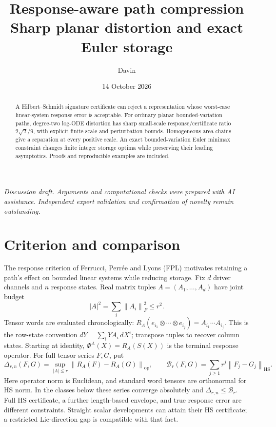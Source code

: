 \documentclass[11pt,a4paper]{article}
\title{\vspace{-12mm}Response-aware path compression\\
\large Sharp planar distortion and exact Euler storage}
\author{Davin}
\date{14 October 2026}
\newcommand{\HS}{\mathrm{HS}}
\newcommand{\op}{\mathrm{op}}
\newcommand{\B}{\mathcal B}
\newcommand{\Del}{\Delta}
\newcommand{\norm}[1]{\left\lVert#1\right\rVert}
\begin{document}
\maketitle
\vspace{-6mm}
\begin{abstract}
A Hilbert--Schmidt signature certificate can reject a representation whose
worst-case linear-system response error is acceptable. For ordinary planar
bounded-variation paths, degree-two log-ODE distortion has sharp small-scale
response/certificate ratio \(2\sqrt2/9\), with explicit finite-scale and
perturbation bounds. Homogeneous area chains give a separation at every
positive scale. An exact bounded-variation Euler minimax constraint changes
finite integer storage optima while preserving their leading asymptotics.
Proofs and reproducible examples are included.
\end{abstract}
\vspace{-2mm}
{\small\emph{Discussion draft. Arguments and computational checks were prepared
with AI assistance. Independent expert validation and confirmation of novelty
remain outstanding.}}

\section{Criterion and comparison}
The response criterion of Ferrucci, Perr\'ee and Lyons (FPL)
\cite{ferrucci2026concise} motivates retaining a path's effect on bounded
linear systems while reducing storage. Fix \(d\) driver channels and \(n\)
response states. Real matrix tuples \(A=(A_1,\ldots,A_d)\) have joint budget
\[
 |A|^2=\sum_i\norm{A_i}_F^2\le r^2.
\]
Tensor words are evaluated chronologically:
\(R_A(e_{i_1}\otimes\cdots\otimes e_{i_j})=A_{i_1}\cdots A_{i_j}\).
This is the row-state convention \(dY=\sum_iYA_i\,dX^i\); transpose tuples
to recover column states. Starting at identity,
\(\Phi^A(X)=R_A(S(X))\) is the terminal response operator.
For full tensor series \(F,G\), put
\begin{equation}\label{eq:criterion}
 \Del_{r,n}(F,G)=\sup_{|A|\le r}\norm{R_A(F)-R_A(G)}_{\op},\qquad
 \B_r(F,G)=\sum_{j\ge1}r^j\norm{F_j-G_j}_{\HS}.
\end{equation}
Here operator norm is Euclidean, and standard word tensors are orthonormal
for HS norm. In the classes below these series converge absolutely and
\(\Del_{r,n}\le\B_r\).
Full HS certificate, a further length-based envelope, and true response error
are different constraints. Straight scalar developments can attain their
HS certificate; a restricted Lie-direction gap is compatible with that fact.
\end{document}
